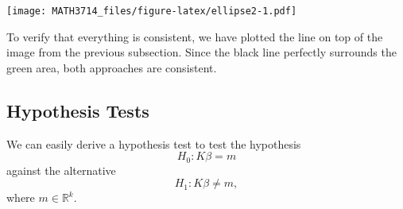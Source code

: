 \documentclass[
  a4paper,
]{article}
\newenvironment{Shaded}{\begin{snugshade}}{\end{snugshade}}
\newcommand{\AttributeTok}[1]{\textcolor[rgb]{0.77,0.63,0.00}{#1}}
\newcommand{\DecValTok}[1]{\textcolor[rgb]{0.00,0.00,0.81}{#1}}
\newcommand{\FunctionTok}[1]{\textcolor[rgb]{0.00,0.00,0.00}{#1}}
\newcommand{\NormalTok}[1]{#1}
\newcommand{\OtherTok}[1]{\textcolor[rgb]{0.56,0.35,0.01}{#1}}
\newcommand{\SpecialCharTok}[1]{\textcolor[rgb]{0.00,0.00,0.00}{#1}}
\newcommand{\StringTok}[1]{\textcolor[rgb]{0.31,0.60,0.02}{#1}}
\theoremstyle{definition}
\theoremstyle{definition}
\theoremstyle{definition}
\theoremstyle{definition}
\theoremstyle{remark}
\begin{document}
\begin{Shaded}
\end{Shaded}

\texttt{[image: MATH3714\_files/figure-latex/ellipse2-1.pdf]}

To verify that everything is consistent, we have plotted the line on top
of the image from the previous subsection. Since the black line perfectly
surrounds the green area, both approaches are consistent.

\hypertarget{sec:simult-test}{%
\subsection{Hypothesis Tests}\label{sec:simult-test}}

We can easily derive a hypothesis test to test the hypothesis
\begin{equation*}
  H_0\colon K\beta = m
\end{equation*}
against the alternative
\begin{equation*}
  H_1\colon K\beta \neq m,
\end{equation*}
where \(m \in \mathbb{R}^k\).
\end{document}
